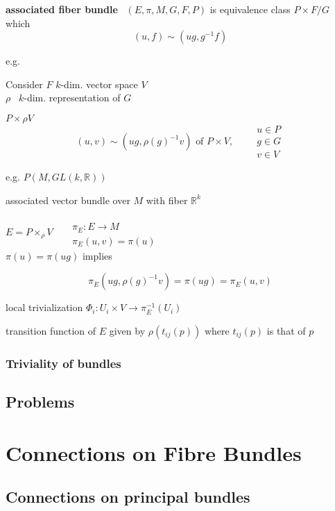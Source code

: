 \documentclass[twoside]{amsart}
\begin{document}
\textbf{associated fiber bundle } \, $(E, \pi, M, G, F, P)$ is equivalence class $P \times F/ G$ which 
\[
(u, f) \sim ( ug, g^{-1}f)
\]

e.g.  

Consider $F$ $k$-dim. vector space $V$ \\
\quad $\rho$ \, $k$-dim. representation of $G$

$P\times \rho V$ 
\[
(u,v) \sim (ug, \rho(g)^{-1} v) \text{ of } P \times V, \quad \, \begin{aligned} 
  & u \in P \\
& g \in G \\
  & v \in V \end{aligned}
\]

e.g. $P(M,GL(k, \mathbb{R}))$

associated vector bundle over $M$ with fiber $\mathbb{R}^k$

$E = P \times_{\rho} V$ \quad \, $\begin{aligned}
  & \quad \\
  & \pi_E : E \to M \\
  & \pi_E(u,v) = \pi(u) 
\end{aligned}$ \\

$\pi(u) = \pi(ug)$ implies 

\[
\pi_E(ug, \rho(g)^{-1}v) = \pi(ug) = \pi_E(u,v)
\]

local trivialization $\Phi_i : U_i \times V \to \pi^{-1}_E(U_i)$


transition function of $E$ given by $\rho(t_{ij}(p))$ where $t_{ij}(p)$ is that of $p$




\subsubsection{ Triviality of bundles }


\subsection*{ Problems }




\section{Connections on Fibre Bundles}

\subsection{Connections on principal bundles }
\end{document}
